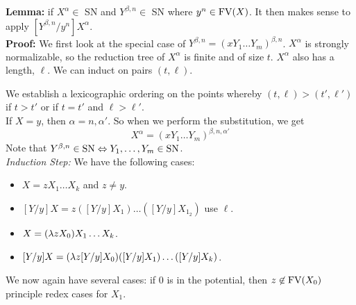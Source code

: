 \textbf{Lemma:} if $X^{\alpha} \in $ SN and $Y^{\beta,n} \in $ SN where $y^n \in \hbox{FV}(X)$. It then makes sense to apply $[Y^{\beta,n}/y^{n}]X^{\alpha}$.\\

\textbf{Proof:} We first look at the special case of $Y^{\beta,n} = (xY_1\ldots Y_m)^{\beta,n}$. $X^{\alpha}$ is strongly normalizable, so the reduction tree of $X^\alpha$ is finite and of size $t$. $X^{\alpha}$ also has a length, $\ell$. We can induct on pairs $(t,\ell)$.

\begin{center}
\end{center}

We establish a lexicographic ordering on the points whereby $(t,\ell) > (t',\ell')$ if $t > t'$ or if $t = t'$ and $\ell > \ell'$.\\

If $X = y$, then $\alpha = n,\alpha'$. So when we perform the substitution, we get
\begin{equation*}
  [Y^{\alpha,n}/y^n]X^{\alpha} = (xY_1\ldots Y_m)^{\beta,n,\alpha'}
\end{equation*}
Note that $Y^{\beta,n} \in \hbox{SN} \Leftrightarrow Y_1,\ldots,Y_m \in \hbox{SN}$.\\

\textit{Induction Step:} We have the following cases:
\begin{itemize}
  \item $X = zX_1\ldots X_k$ and $z \not= y.$
  \item $[Y/y]X = z([Y/y]X_1)\ldots([Y/y]X_{1_2})$ use $\ell$.
  \item $X = (\lambda zX_0)X_1\ldots X_k$.
  \item $[Y/y]X = (\lambda z [Y/y]X_0)([Y/y]X_1)\ldots([Y/y]X_k)$.
\end{itemize}

We now again have several cases: if $0$ is in the potential, then $z \not\in \hbox{FV}(X_0)$  principle redex cases for $X_1$.